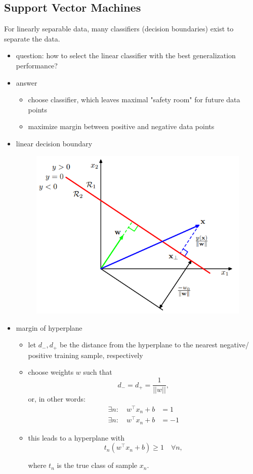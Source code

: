 \documentclass{article}
\begin{document}
\subsection{Support Vector Machines}

For linearly separable data, many classifiers (decision boundaries) exist to separate the data.

\begin{itemize}
  \item question: how to select the linear classifier with the best generalization performance?
  \item answer
  \begin{itemize}
    \item choose classifier, which leaves maximal "safety room" for future data points
    \item maximize margin between positive and negative data points
  \end{itemize}
  \item linear decision boundary
  \begin{figure}[H]
    \centering
    \includegraphics[width=.7\textwidth]{linear-discriminant-geometric2}
  \end{figure}
  \item margin of hyperplane
  \begin{itemize}
    \item let $d_-, d_+$ be the distance from the hyperplane to the nearest negative/ positive training sample, respectively
    \item choose weights $w$ such that
    \[
      d_- = d_+ = \frac{1}{||w||},
    \]
    or, in other words:
    \begin{align*}
      \exists n: \quad w^\top x_n + b &= 1 \\
      \exists n: \quad w^\top x_n + b &= -1
    \end{align*}
    \item this leads to a hyperplane with
    \[
      t_n (w^\top x_n + b) \geq 1 \quad \forall n,
    \]

    where $t_n$ is the true class of sample $x_n$.
  \end{itemize}
\end{itemize}
\end{document}
